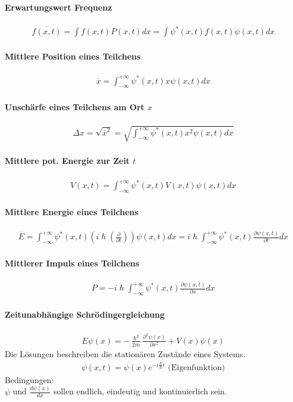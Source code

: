 \documentclass[10pt,a4paper]{article}
\begin{document}
\paragraph{Erwartungswert Frequenz}
\begin{align}
\overline{f(x,t)} = \int f(x,t)P(x,t)dx = \int \psi^*(x,t)f(x,t)\psi(x,t)dx
\end{align}
\paragraph{Mittlere Position eines Teilchens}
\begin{align}
\overline{x}= \int_{-\infty}^{+\infty} \psi^*(x,t) x \psi(x,t)dx
\end{align}
\paragraph{Unschärfe eines Teilchens am Ort $x$}
\begin{align}
\Delta x = \sqrt{\overline{x}^2}= \sqrt{\int_{-\infty}^{+\infty} \psi^*(x,t) x^2 \psi(x,t)dx}
\end{align}
\paragraph{Mittlere pot. Energie zur Zeit $t$}
\begin{align}
V(x,t) = \int_{-\infty}^{+\infty} \psi^*(x,t) V(x,t) \psi(x,t)dx
\end{align}
\paragraph{Mittlere Energie eines Teilchens}
\begin{align}
\overline{E}=\int_{-\infty}^{+\infty} \psi^*(x,t) (i\hslash(\frac{\partial}{\partial t})) \psi(x,t)dx =i\hslash \int_{-\infty}^{+\infty} \psi^*(x,t) \frac{\partial\psi(x,t)}{\partial t} dx
\end{align}
\paragraph{Mittlerer Impuls eines Teilchens}
\begin{align}
\overline{P}=-i\hslash \int_{-\infty}^{+\infty} \psi^*(x,t) \frac{\partial\psi(x,t)}{\partial x} dx
\end{align}
\paragraph{Zeitunabhängige Schrödingergleichung}
\begin{align}
E\psi(x)= -\frac{\hslash^2}{2m}\frac{\partial^2\psi(x)}{\partial x^2} + V(x)\psi(x)
\end{align}
Die Lösungen beschreiben die stationären Zustände eines Systems.
\begin{align}
\psi(x,t) = \psi(x)e^{-i\frac{E}{\hslash}t} \text{ (Eigenfunktion)}
\end{align}
Bedingungen:\\
$\psi$ und $\frac{d\psi(x)}{dx}$ sollen
endlich, eindeutig und kontinuierlich sein.
\end{document}
